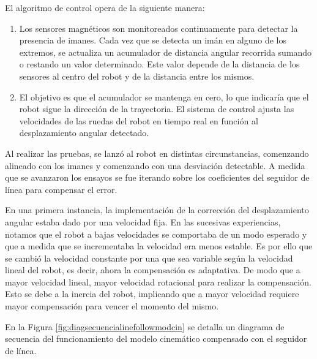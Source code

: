 El algoritmo de control opera de la siguiente manera:

\begin{enumerate}
    \item Los sensores magnéticos son monitoreados continuamente para detectar la presencia de imanes. Cada vez que se detecta un imán en alguno de los extremos, se actualiza un acumulador de distancia angular recorrida sumando o restando un valor determinado. Este valor depende de la distancia de los sensores al centro del robot y de la distancia entre los mismos.

    \item El objetivo es que el acumulador se mantenga en cero, lo que indicaría que el robot sigue la dirección de la trayectoria. El sistema de control ajusta las velocidades de las ruedas del robot en tiempo real en función al desplazamiento angular detectado.    
\end{enumerate}

Al realizar las pruebas, se lanzó al robot en distintas circunstancias, comenzando alineado con los imanes y comenzando con una desviación detectable. A medida que se avanzaron los ensayos se fue iterando sobre los coeficientes del seguidor de línea para compensar el error.

En una primera instancia, la implementación de la corrección del desplazamiento angular estaba dado por una velocidad fija. En las sucesivas experiencias, notamos que el robot a bajas velocidades se comportaba de un modo esperado y que a medida que se incrementaba la velocidad era menos estable. Es por ello que se cambió la velocidad constante por una que sea variable según la velocidad lineal del robot, es decir, ahora la compensación es adaptativa. De modo que a mayor velocidad lineal, mayor velocidad rotacional para realizar la compensación. Esto se debe a la inercia del robot, implicando que a mayor velocidad requiere mayor compensación para vencer el momento del mismo.

En la Figura \ref{fig:diagsecuencialinefollowmodcin} se detalla un diagrama de secuencia del funcionamiento del modelo cinemático compensado con el seguidor de línea.

